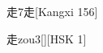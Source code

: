 \begin{entry}{走}{7}{⾛}[Kangxi 156]
  \begin{phonetics}{走}{zou3}[][HSK 1]
  \end{phonetics}
\end{entry}
